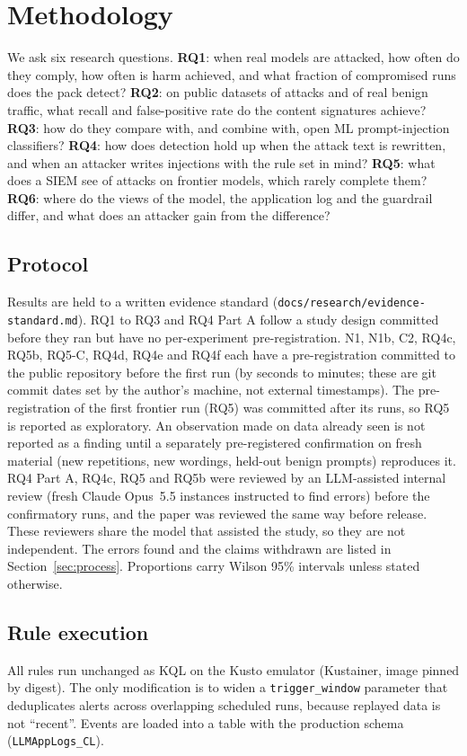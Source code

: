 \section{Methodology}
\label{sec:method}

We ask six research questions.
\textbf{RQ1}: when real models are attacked, how often do they comply, how often is harm achieved,
and what fraction of compromised runs does the pack detect?
\textbf{RQ2}: on public datasets of attacks and of real benign traffic, what recall and false-positive
rate do the content signatures achieve?
\textbf{RQ3}: how do they compare with, and combine with, open ML prompt-injection classifiers?
\textbf{RQ4}: how does detection hold up when the attack text is rewritten, and when an attacker
writes injections with the rule set in mind?
\textbf{RQ5}: what does a SIEM see of attacks on frontier models, which rarely complete them?
\textbf{RQ6}: where do the views of the model, the application log and the guardrail differ, and
what does an attacker gain from the difference?

\subsection{Protocol}
Results are held to a written evidence standard (\texttt{docs/research/evidence-standard.md}). RQ1 to
RQ3 and RQ4 Part A follow a study design committed before they ran but have no per-experiment
pre-registration. N1, N1b, C2, RQ4c, RQ5b, RQ5-C, RQ4d, RQ4e and RQ4f each have a pre-registration
committed to the public repository before the first run (by seconds to minutes; these are git commit
dates set by the author's machine, not external timestamps). The pre-registration of the first
frontier run (RQ5) was committed after its runs, so RQ5 is reported as exploratory. An observation made on
data already seen is not reported as a finding until a separately pre-registered confirmation on
fresh material (new repetitions, new wordings, held-out benign prompts) reproduces it. RQ4 Part A, RQ4c, RQ5 and RQ5b were reviewed
by an LLM-assisted internal review (fresh Claude Opus~5.5 instances instructed to find errors) before
the confirmatory runs, and the paper was reviewed the same way before release. These reviewers share
the model that assisted the study, so they are not independent. The errors found and the claims withdrawn are listed in Section~\ref{sec:process}.
Proportions carry Wilson 95\% intervals unless stated otherwise.

\subsection{Rule execution}
All rules run unchanged as KQL on the Kusto emulator (Kustainer, image pinned by digest). The only
modification is to widen a \texttt{trigger\_window} parameter that deduplicates alerts across
overlapping scheduled runs, because replayed data is not ``recent''. Events are loaded into a table
with the production schema (\texttt{LLMAppLogs\_CL}).

